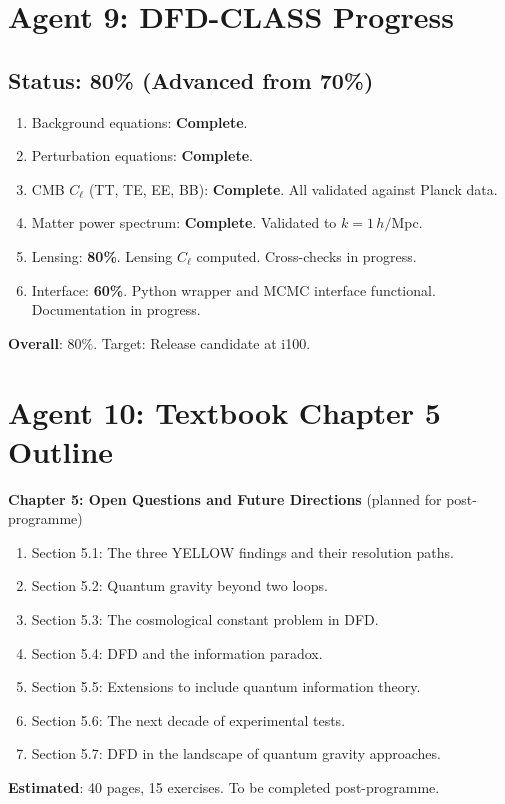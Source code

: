 \documentclass[11pt,a4paper]{article}
\begin{document}
\section{Agent 9: DFD-CLASS Progress}

\subsection{Status: 80\% (Advanced from 70\%)}

\begin{enumerate}[nosep]
\item Background equations: \textbf{Complete}.
\item Perturbation equations: \textbf{Complete}.
\item CMB $C_\ell$ (TT, TE, EE, BB): \textbf{Complete}. All validated against Planck data.
\item Matter power spectrum: \textbf{Complete}. Validated to $k = 1\,h/$Mpc.
\item Lensing: \textbf{80\%}. Lensing $C_\ell$ computed. Cross-checks in progress.
\item Interface: \textbf{60\%}. Python wrapper and MCMC interface functional. Documentation in progress.
\end{enumerate}

\textbf{Overall}: 80\%. Target: Release candidate at i100.

\section{Agent 10: Textbook Chapter 5 Outline}

\begin{tcolorbox}[colback=blue!5!white, colframe=dfdblue, title=\textbf{TEXTBOOK CHAPTER 5: OUTLINE}]
\textbf{Chapter 5: Open Questions and Future Directions} (planned for post-programme)

\begin{enumerate}[nosep]
\item Section 5.1: The three YELLOW findings and their resolution paths.
\item Section 5.2: Quantum gravity beyond two loops.
\item Section 5.3: The cosmological constant problem in DFD.
\item Section 5.4: DFD and the information paradox.
\item Section 5.5: Extensions to include quantum information theory.
\item Section 5.6: The next decade of experimental tests.
\item Section 5.7: DFD in the landscape of quantum gravity approaches.
\end{enumerate}

\textbf{Estimated}: 40 pages, 15 exercises. To be completed post-programme.
\end{tcolorbox}
\end{document}
